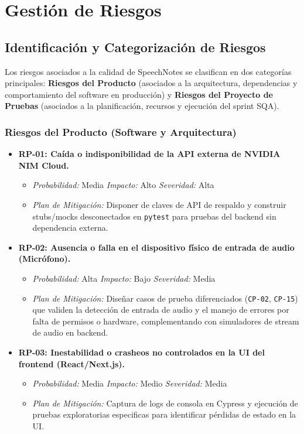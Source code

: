 \chapter{Gestión de Riesgos}
\label{sec:riesgos}

\section{Identificación y Categorización de Riesgos}
\label{sec:identificacion-riesgos}

Los riesgos asociados a la calidad de SpeechNotes se clasifican en dos categorías principales: \textbf{Riesgos del Producto} (asociados a la arquitectura, dependencias y comportamiento del software en producción) y \textbf{Riesgos del Proyecto de Pruebas} (asociados a la planificación, recursos y ejecución del sprint SQA).

\subsection{Riesgos del Producto (Software y Arquitectura)}
\label{subsec:riesgos-producto}

\begin{itemize}
    \item \textbf{RP-01: Caída o indisponibilidad de la API externa de NVIDIA NIM Cloud.}
    \begin{itemize}
        \item \textit{Probabilidad:} Media \quad \textit{Impacto:} Alto \quad \textit{Severidad:} Alta
        \item \textit{Plan de Mitigación:} Disponer de claves de API de respaldo y construir stubs/mocks desconectados en \texttt{pytest} para pruebas del backend sin dependencia externa.
    \end{itemize}
    \item \textbf{RP-02: Ausencia o falla en el dispositivo físico de entrada de audio (Micrófono).}
    \begin{itemize}
        \item \textit{Probabilidad:} Alta \quad \textit{Impacto:} Bajo \quad \textit{Severidad:} Media
        \item \textit{Plan de Mitigación:} Diseñar casos de prueba diferenciados (\texttt{CP-02}, \texttt{CP-15}) que validen la detección de entrada de audio y el manejo de errores por falta de permisos o hardware, complementando con simuladores de stream de audio en backend.
    \end{itemize}
    \item \textbf{RP-03: Inestabilidad o crasheos no controlados en la UI del frontend (React/Next.js).}
    \begin{itemize}
        \item \textit{Probabilidad:} Media \quad \textit{Impacto:} Medio \quad \textit{Severidad:} Media
        \item \textit{Plan de Mitigación:} Captura de logs de consola en Cypress y ejecución de pruebas exploratorias especificas para identificar pérdidas de estado en la UI.
    \end{itemize}
\end{itemize}

